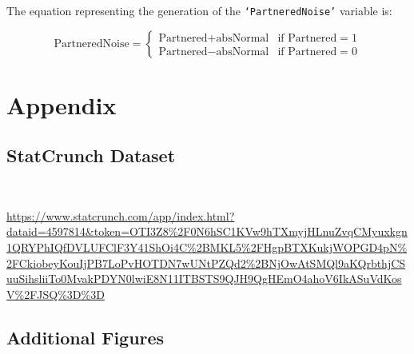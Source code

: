 \documentclass[12pt]{article}
\begin{document}
The equation representing the generation of the \texttt{`PartneredNoise'} variable is:

\begin{equation}
\text{PartneredNoise} = 
\begin{cases}
    \text{Partnered} + \text{absNormal} & \text{if } \text{Partnered} = 1 \\
    \text{Partnered} - \text{absNormal} & \text{if } \text{Partnered} = 0
\end{cases}
\end{equation}

\newpage

\section{Appendix}

\subsection{StatCrunch Dataset}\

\begin{tiny}
\url{https://www.statcrunch.com/app/index.html?dataid=4597814&token=OTI3Z8\%2F0N6hSC1KVw9hTXmyjHLnuZvqCMyuxkgn1QRYPhIQfDVLUFClF3Y41ShOi4C\%2BMKL5\%2FHgpBTXKukjWOPGD4pN\%2FCkiobeyKouIjPB7LoPvHOTDN7wUNtPZQd2\%2BNjOwAtSMQl9aKQrbthjCSuuSihsliiTo0MvakPDYN0lwiE8N11ITBSTS9QJH9QgHEmO4ahoV6IkASuVdKosV\%2FJSQ\%3D\%3D}
\end{tiny}

\subsection{Additional Figures}
\end{document}
